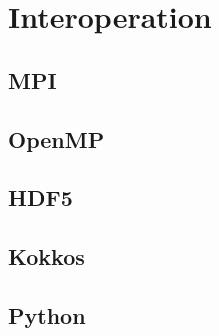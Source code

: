 \chapter{Interoperation}
\label{chap:interop}

\section{MPI}

\section{OpenMP}

\section{HDF5}

\section{Kokkos}

\section{Python}


